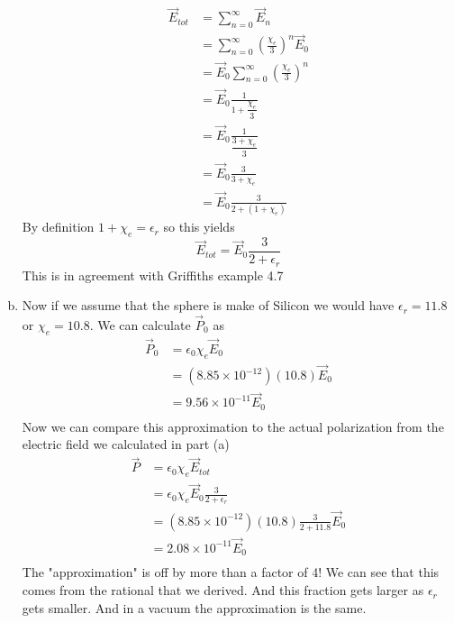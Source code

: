 \documentclass[11pt]{article}
\numberwithin{equation}{section}
\newcommand{\vecE}{\vec{E}}
\newcommand{\vecP}{\vec{P}}
\begin{document}
\begin{enumerate}[(a)]
\begin{align*}
\vecE_{tot} &= \sum_{n=0}^{\infty}\vecE_n\\
&= \sum_{n=0}^{\infty}\left(\frac{\chi_e}{3}\right)^n\vecE_0\\
&= \vecE_0\sum_{n=0}^{\infty}\left(\frac{\chi_e}{3}\right)^n\\
&= \vecE_0\frac{1}{1+\dfrac{\chi_e}{3}}\\
&= \vecE_0\frac{1}{\dfrac{3+\chi_e}{3}}\\
&= \vecE_0\frac{3}{3+\chi_e}\\
&= \vecE_0\frac{3}{2+(1+\chi_e)}
\end{align*}
By definition $1+\chi_e=\epsilon_r$ so this yields
$$\vecE_{tot} = \vecE_0\frac{3}{2+\epsilon_r}$$
This is in agreement with Griffiths example 4.7 

\item
Now if we assume that the sphere is make of Silicon we would have $\epsilon_r=11.8$ or $\chi_e = 10.8$. We can calculate $\vecP_0$ as
\begin{align*}
\vecP_0 &=\epsilon_0\chi_e\vecE_0\\
&=(8.85\times10^{-12})(10.8)\vecE_0\\
&=9.56\times10^{-11}\vecE_0\\
\end{align*}
Now we can compare this approximation to the actual polarization from the electric field we calculated in part (a)
\begin{align*}
\vecP &=\epsilon_0\chi_e\vecE_{tot}\\
&=\epsilon_0\chi_e\vecE_0\frac{3}{2+\epsilon_r}\\
&=(8.85\times10^{-12})(10.8)\frac{3}{2+11.8}\vecE_0\\
&=2.08\times10^{-11}\vecE_0\\
\end{align*}
The "approximation" is off by more than a factor of 4! We can see that this comes from the rational that we derived. And this fraction gets larger as $\epsilon_r$ gets smaller. And in a vacuum the approximation is the same.
\end{enumerate}
\end{document}
